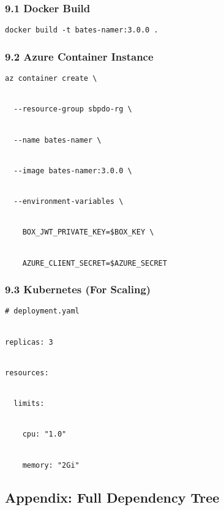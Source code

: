 \documentclass[
]{article}
\begin{document}
\hypertarget{docker-build}{%
\subsubsection{\texorpdfstring{\textbf{9.1 Docker
Build}}{9.1 Docker Build}}\label{docker-build}}

\texttt{docker\ build\ -t\ bates-namer:3.0.}\texttt{0\ .}

\hypertarget{azure-container-instance}{%
\subsubsection{\texorpdfstring{\textbf{9.2 Azure Container
Instance}}{9.2 Azure Container Instance}}\label{azure-container-instance}}

\texttt{az\ container\ create\ \textbackslash{}}\strut \\
\texttt{\ \ -\/-resource-group\ sbpdo-rg\ \textbackslash{}}\strut \\
\texttt{\ \ -\/-name\ bates-namer\ \textbackslash{}}\strut \\
\texttt{\ \ -\/-image\ bates-namer:3.0.0\ \textbackslash{}}\strut \\
\texttt{\ \ -\/-environment-v}\texttt{ariables\ \textbackslash{}}\strut \\
\texttt{\ \ \ \ BOX\_JWT\_PRIVATE\_KEY=\$BOX\_KEY\ \textbackslash{}}\strut \\
\texttt{\ \ \ \ AZURE\_CLIENT\_SECRET=\$AZURE\_SECRET}

\hypertarget{kubernetes-for-scaling}{%
\subsubsection{\texorpdfstring{\textbf{9.3 Kubernetes (For
Scaling)}}{9.3 Kubernetes (For Scaling)}}\label{kubernetes-for-scaling}}

\texttt{\#\ deployment.yaml}\strut \\
\texttt{replicas:\ 3}\strut \\
\texttt{resources:}\strut \\
\texttt{\ \ limits:}\strut \\
\texttt{\ \ \ \ cpu:\ "1.0"}\strut \\
\texttt{\ \ \ \ memory:\ "2Gi"}

\hypertarget{appendix-full-dependency-tree}{%
\subsection{\texorpdfstring{\textbf{Appendix: Full Dependency
Tree}}{Appendix: Full Dependency Tree}}\label{appendix-full-dependency-tree}}
\end{document}
